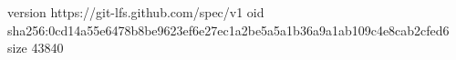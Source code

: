version https://git-lfs.github.com/spec/v1
oid sha256:0cd14a55e6478b8be9623ef6e27ec1a2be5a5a1b36a9a1ab109c4e8cab2cfed6
size 43840
